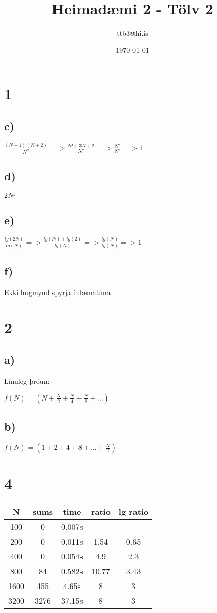\documentclass{article}
\title{Heimadæmi 2 - Tölv 2}
\author{ttb3@hi.is}
\date{\today}
\begin{document}
\maketitle

\section*{1}
\subsection*{c)}
$\frac{(N+1)(N+2)}{N^2} => \frac{N²+3N+2}{N²} => \frac{N²}{N²} => 1$

\subsection*{d)}
$2N³$

\subsection*{e)}
$\frac{lg(2N)}{lg(N)} => \frac{lg(N)+lg(2)}{lg(N)} => \frac{lg(N)}{lg(N)} => 1$

\subsection*{f)}
Ekki hugmynd spyrja í dæmatíma

\section*{2}
\subsection*{a)}
Línuleg þróun:

$f(N) = (N+\frac{N}{2}+\frac{N}{4}+\frac{N}{8}+...)$

\subsection*{b)}

$f(N) = (1+2+4+8+...+\frac{N}{2})$

\section*{4}
\begin{center}
    \begin{tabular}{|c|c|c|c|c|}
        \hline
        N&sums&time&ratio&lg ratio\\
        \hline
        100&0&0.007s&-&-\\
        \hline
        200&0&0.011s&1.54&0.65\\
        \hline
        400&0&0.054s&4.9&2.3\\
        \hline
        800&84&0.582s&10.77&3.43\\
        \hline
        1600&455&4.65s&8&3\\
        \hline
        3200&3276&37.15s&8&3\\
        \hline
    \end{tabular}
\end{center}
\end{document}
